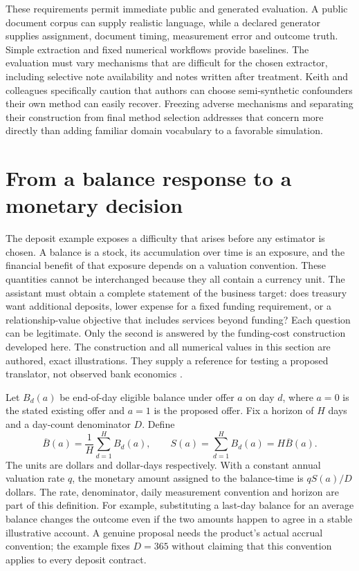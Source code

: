 These requirements permit immediate public and generated evaluation. A
public document corpus can supply realistic language, while a declared
generator supplies assignment, document timing, measurement error and
outcome truth. Simple extraction and fixed numerical workflows provide
baselines. The evaluation must vary mechanisms that are difficult for
the chosen extractor, including selective note availability and notes
written after treatment. Keith and colleagues specifically caution that
authors can choose semi-synthetic confounders their own method can
easily recover. Freezing adverse mechanisms and separating their
construction from final method selection addresses that concern more
directly than adding familiar domain vocabulary to a favorable
simulation. \cite{exec13_census_text_review_arxiv}

\label{exec13:census-measurement-end}


\section{From a balance response to a monetary decision}
\label{exec17:l2-monetary}

The deposit example exposes a difficulty that arises before any estimator is
chosen. A balance is a stock, its accumulation over time is an exposure, and
the financial benefit of that exposure depends on a valuation convention.
These quantities cannot be interchanged because they all contain a currency
unit. The assistant must obtain a complete statement of the business target:
does treasury want additional deposits, lower expense for a fixed funding
requirement, or a relationship-value objective that includes services beyond
funding? Each question can be legitimate. Only the second is answered by the
funding-cost construction developed here. The construction and all numerical
values in this section are authored, exact illustrations. They supply a
reference for testing a proposed translator, not observed bank economics
\citep{exec17_l2_monetary_exact}.

Let $B_d(a)$ be end-of-day eligible balance under offer $a$ on day $d$, where
$a=0$ is the stated existing offer and $a=1$ is the proposed offer. Fix a
horizon of $H$ days and a day-count denominator $D$. Define
\begin{equation}
 \overline B(a)=\frac1H\sum_{d=1}^H B_d(a),\qquad
 S(a)=\sum_{d=1}^H B_d(a)=H\overline B(a).
 \label{exec17:l2-stock}
\end{equation}
The units are dollars and dollar-days respectively. With a constant annual
valuation rate $q$, the monetary amount assigned to the balance-time is
$qS(a)/D$ dollars. The rate, denominator, daily measurement convention and
horizon are part of this definition. For example, substituting a last-day
balance for an average balance changes the outcome even if the two amounts
happen to agree in a stable illustrative account. A genuine proposal needs
the product's actual accrual convention; the example fixes $D=365$ without
claiming that this convention applies to every deposit contract.

